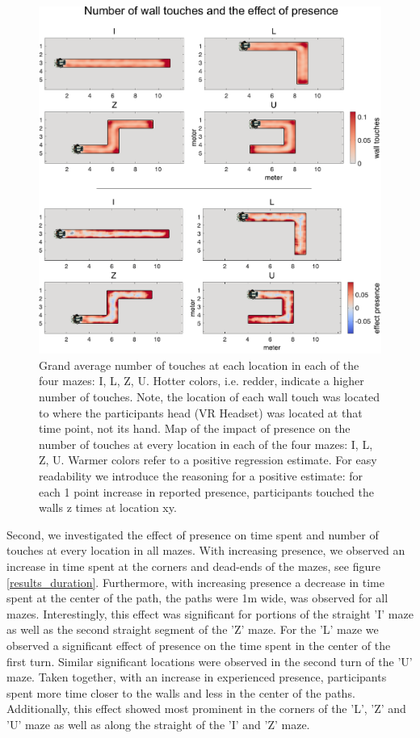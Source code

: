 \begin{figure}[h]
\centering
\includegraphics[width=\linewidth]{figures/touches.pdf}
\vspace{0pt}
\caption{Grand average number of touches at each location in each of the four mazes: I, L, Z, U. Hotter colors, i.e. redder, indicate a higher number of touches. Note, the location of each wall touch was located to where the participants head (VR Headset) was located at that time point, not its hand. Map of the impact of presence on the number of touches at every location in each of the four mazes: I, L, Z, U. Warmer colors refer to a positive regression estimate. For easy readability we introduce the reasoning for a positive estimate: for each 1 point increase in reported presence, participants touched the walls z times at location xy.}
\label{results_touches}
\end{figure}

Second, we investigated the effect of presence on time spent and number of touches at every location in all mazes. With increasing presence, we observed an increase in time spent at the corners and dead-ends of the mazes, see figure \ref{results_duration}. Furthermore, with increasing presence a decrease in time spent at the center of the path, the paths were 1m wide, was observed for all mazes. Interestingly, this effect was significant for portions of the straight 'I' maze as well as the second straight segment of the 'Z' maze. For the 'L' maze we observed a significant effect of presence on the time spent in the center of the first turn. Similar significant locations were observed in the second turn of the 'U' maze. Taken together, with an increase in experienced presence, participants spent more time closer to the walls and less in the center of the paths. Additionally, this effect showed most prominent in the corners of the 'L', 'Z' and 'U' maze as well as along the straight of the 'I' and 'Z' maze.

